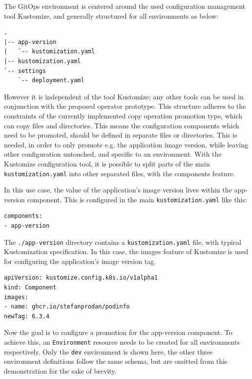 The GitOps environment is centered around the used configuration management tool
Kustomize, and generally structured for all environments as below:

\begin{lstlisting}
.
|-- app-version
|   `-- kustomization.yaml
|-- kustomization.yaml
`-- settings
    `-- deployment.yaml
\end{lstlisting}

However it is independent of the tool Kustomize;
any other tools can be used in conjunction with the proposed operator prototype.
This structure adheres to the constraints of the currently implemented
copy operation promotion type, which can copy files and directories.
This means the configuration components which need to be promoted,
should be defined in separate files or directories.
This is needed, in order to only promote e.g. the application image version,
while leaving other configuration untouched, and specific to an environment.
With the Kustomize configuration tool, it is possible to split
parts of the main \lstinline|kustomization.yaml| into other separated files,
with the components feature.

In this use case, the value of the application's image version lives within the 
app-version component. This is configured in the main \lstinline|kustomization.yaml|
like this:

\begin{lstlisting}
components:
- app-version
\end{lstlisting}

The \lstinline|./app-version| directory contains a \lstinline|kustomization.yaml| file,
with typical Kustomization specification.
In this case, the images feature of Kustomize is used for configuring the application's
image version tag.

\begin{lstlisting}
apiVersion: kustomize.config.k8s.io/v1alpha1
kind: Component
images:
- name: ghcr.io/stefanprodan/podinfo
newTag: 6.3.4
\end{lstlisting}

Now the goal is to configure a promotion for the app-version component.
To achieve this, 
an \lstinline|Environment| resource needs to be created
for all environments respectively.
Only the \lstinline|dev| environment is shown here,
the other three environment definitions follow the same schema,
but are omitted from this demonstration for the sake of brevity.



